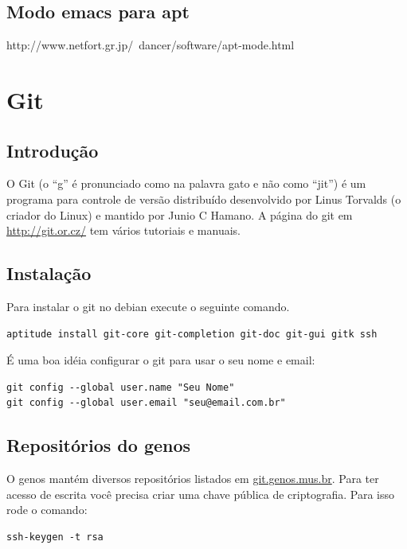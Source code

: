 \documentclass[12pt,brazil]{book}
\begin{document}
\section{Modo emacs para apt}
\label{sec:modo-emacs-para}

http://www.netfort.gr.jp/~dancer/software/apt-mode.html

\chapter{Git}
\label{cha:git}

\section{Introdução}
\label{sec:introducao}

O Git (o ``g'' é pronunciado como na palavra gato e não como ``jit'')
é um programa para controle de versão distribuído desenvolvido por
Linus Torvalds (o criador do Linux) e mantido por Junio C Hamano. A
página do git em \url{http://git.or.cz/} tem vários tutoriais e
manuais.

\section{Instalação}
\label{sec:instalacao-3}

Para instalar o git no debian execute o seguinte comando.

\begin{verbatim}
aptitude install git-core git-completion git-doc git-gui gitk ssh
\end{verbatim}

É uma boa idéia configurar o git para usar o seu nome e email:

\begin{verbatim}
git config --global user.name "Seu Nome"
git config --global user.email "seu@email.com.br"
\end{verbatim}

\section{Repositórios do genos}
\label{sec:acesso-de-escrita}

O genos mantém diversos repositórios listados em
\url{git.genos.mus.br}. Para ter acesso de escrita você precisa criar
uma chave pública de criptografia. Para isso rode o comando:

\begin{verbatim}
ssh-keygen -t rsa
\end{verbatim}
\end{document}
